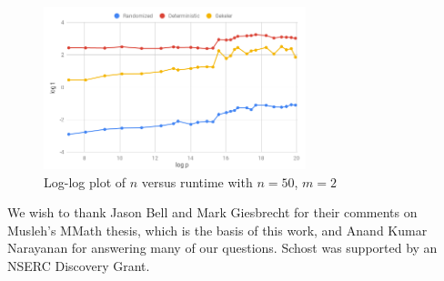 \documentclass[sigconf]{acmart}
\begin{document}
\vspace{-0.25cm}

\begin{figure}[h!]\label{fig:ptest50}
\centering
  \includegraphics[width=3in]{chart-50-2.png}
  \caption{Log-log plot of $n$ versus runtime with $n = 50$, $m = 2$}
\end{figure}


\begin{acks}
  We wish to thank Jason Bell and Mark Giesbrecht for their comments
  on Musleh's MMath thesis, which is the basis of this work, and Anand
Kumar  Narayanan for answering many of our questions. Schost was supported
  by an NSERC Discovery Grant.
\end{acks}





\end{document}
